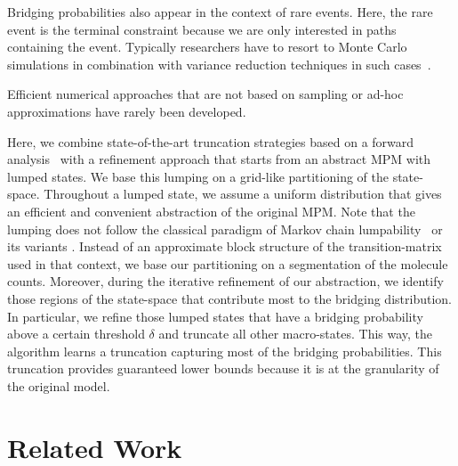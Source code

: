 
Bridging probabilities also appear in the context
of rare events.
Here, the rare event is the terminal constraint because we are only
interested in paths containing the event.
Typically researchers have to resort to Monte Carlo simulations in
combination with variance reduction techniques in such
cases~\parencite{daigle2011automated,kuwahara2008efficient}.

Efficient  numerical approaches  that are not based on sampling or
ad-hoc approximations have rarely been developed.

Here, we combine state-of-the-art truncation strategies based on a
forward analysis~\parencite{lapin2011shave,andreychenko2011parameter}
with a refinement approach that starts from an abstract \ac{MPM}
with lumped states.
We base this lumping on a grid-like partitioning of the state-space.
Throughout a lumped state, we assume a uniform distribution that
gives an efficient and convenient abstraction of the original \ac{MPM}.
Note that the lumping does not follow the classical paradigm of
Markov chain lumpability~\parencite{buchholz1994exact}
or its variants \parencite{dayar1997quasi}.
Instead of an approximate block structure of the transition-matrix
used in that context, we base our partitioning on a segmentation of
the molecule counts.
Moreover, during the iterative refinement of our
abstraction, we identify those regions of
the state-space that contribute most to the
bridging distribution.
In particular, we refine those lumped states that have a
bridging probability above a certain threshold $\delta$ and
truncate all other macro-states.
This way, the algorithm learns a truncation capturing most of the
bridging probabilities.
This truncation provides guaranteed lower bounds because it is at the
granularity of the original model.

\section{Related Work}\label{sec:bridging:related}
